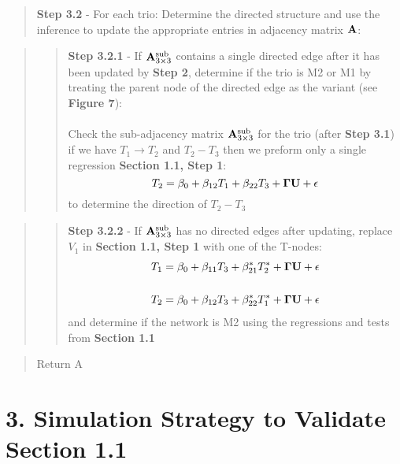 \documentclass[12pt]{report}
\begin{document}
\begin{quote}
\noindent \textbf{Step 3.2} -  For each trio: Determine the directed structure and use the inference to update the appropriate entries in adjacency matrix $\bf{A}$:\\
\end{quote}

\begin{quote}
\begin{quote}
\noindent \textbf{Step 3.2.1} - If ${\bf A}_{3\times3}^{\text{sub}}$ contains a single directed edge after it has been updated by \textbf{Step 2}, determine if the trio is M2 or M1 by treating the parent node of the directed edge as the variant (see \textbf{Figure 7}): \\
\\
Check the sub-adjacency matrix ${\bf A}_{3\times3}^{\text{sub}}$ for the trio (after \textbf{Step 3.1}) if we have $T_1 \rightarrow T_2$ and $T_2 - T_3$ then we preform only a single regression \textbf{Section 1.1, Step 1}:
\[ T_2 = \beta_0 + \beta_{12}T_1 + \beta_{22} T_3 + {\bf \Gamma U} + \epsilon \] 
to determine the direction of $T_2 - T_3$\\
\end{quote}
\end{quote}

\begin{quote}
\begin{quote}
\noindent\textbf{Step 3.2.2} - If ${\bf A}_{3\times3}^{\text{sub}}$ has no directed edges after updating, replace $V_1$ in \textbf{Section 1.1, Step 1} with one of the T-nodes:
\begin{eqnarray}
T_1 = \beta_0 +\beta_{11}T_3+\beta_{21}^{\ast}T_2^{\ast}+{\bf \Gamma U}+ \epsilon \\
\nonumber\\
T_2 = \beta_0 +\beta_{12}T_3+\beta_{22}^{\ast}T_1^{\ast}+{\bf \Gamma U}+ \epsilon 
\end{eqnarray}
and determine if the network is M2 using the regressions and tests from \textbf{Section 1.1}\\
\end{quote} 
\end{quote}

\begin{quote}
Return A
\end{quote}

\section*{3. Simulation Strategy to Validate Section 1.1}
\end{document}
